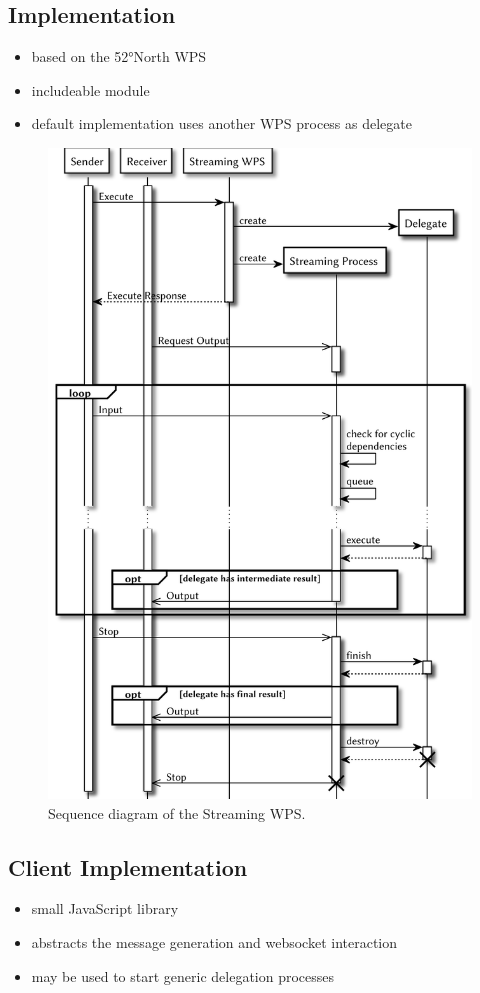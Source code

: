 	\subsection{Implementation}
	\begin{itemize}
		\item based on the 52°North WPS
		\item includeable module
		\item default implementation uses another WPS process as delegate
	\end{itemize}
	\begin{figure}[!htb]
		\centering
		\includegraphics[width=.7868\textwidth]{figures/sequence-diagramm-swps.pdf}
		\caption{\label{fig:sd:swps} Sequence diagram of the Streaming WPS.}
	\end{figure}
	\subsection{Client Implementation}
	\begin{itemize}
		\item small JavaScript library
		\item abstracts the message generation and websocket interaction
		\item may be used to start generic delegation processes
	\end{itemize}
